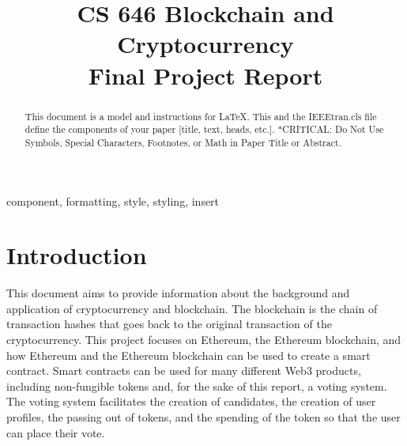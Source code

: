 \documentclass[conference]{IEEEtran}
\begin{document}
\title{CS 646 Blockchain and Cryptocurrency \\
Final Project Report}

\author{
\and
{}
\and
{}
\and
{}
}

\maketitle

\begin{abstract}
This document is a model and instructions for \LaTeX.
This and the IEEEtran.cls file define the components of your paper [title, text, heads, etc.]. *CRITICAL: Do Not Use Symbols, Special Characters, Footnotes, 
or Math in Paper Title or Abstract.
\end{abstract}

\begin{IEEEkeywords}
component, formatting, style, styling, insert
\end{IEEEkeywords}

\section{Introduction}
This document aims to provide information about the background and application of cryptocurrency and blockchain. The blockchain is the chain of transaction hashes that goes back to the original transaction of the cryptocurrency. This project focuses on Ethereum, the Ethereum blockchain, and how Ethereum and the Ethereum blockchain can be used to create a smart contract. Smart contracts can be used for many different Web3 products, including non-fungible tokens and, for the sake of this report, a voting system. The voting system facilitates the creation of candidates, the creation of user profiles, the passing out of tokens, and the spending of the token so that the user can place their vote. 
\end{document}
